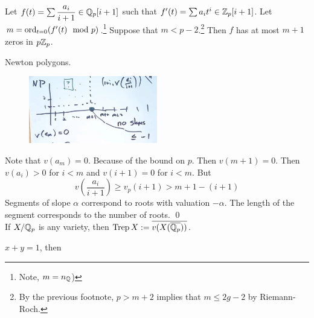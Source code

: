 \begin{lem}[Coleman]
Let $f(t)= \sum \dfrac{a_i}{i+1} \in \mathbb{Q}_p[i+1]$ such that $f'(t)= \sum a_i t^i \in \mathbb{Z}_p[i+1]$. Let $m= \operatorname{ord}_{t=0} (f'(t) \mod p)$.\footnote{Note, $m=n_{\mathbb{Q}}$)} Suppose that $m < p-2$.\footnote{By the previous footnote, $p>m+2$ implies that $m \leq 2g-2$ by Riemann-Roch.} Then $f$ has at most $m+1$ zeros in $p \mathbb{Z}_p$. 
\end{lem}

\pf Newton polygons.

	\begin{figure}[!ht]
	\centering
	\includegraphics[width=0.5\textwidth]{../images/im7.png}
	\end{figure}
	

Note that $v(a_m)=0$. Because of the bound on $p$. Then $v(m+1)=0$. Then $v(a_i)>0$ for $i<m$ and $v(i+1)=0$ for $i<m$. But
	\[
	v\left( \dfrac{a_i}{i+1} \right) \geq v_p(i+1) > m+1 - (i+1)
	\]
Segments of slope $\alpha$ correspond to roots with valuation $-\alpha$. The length of the segment corresponds to the number of roots. \qed \\


If $X/\mathbb{Q}_p$ is any variety, then $\operatorname{Trep} X:= \overline{v(X(\overline{\mathbb{Q}_p}))}$. 


\begin{ex}
$x+y= 1$, then
	
	\begin{figure}[!ht]
	\centering
	\end{figure}
\end{ex}



